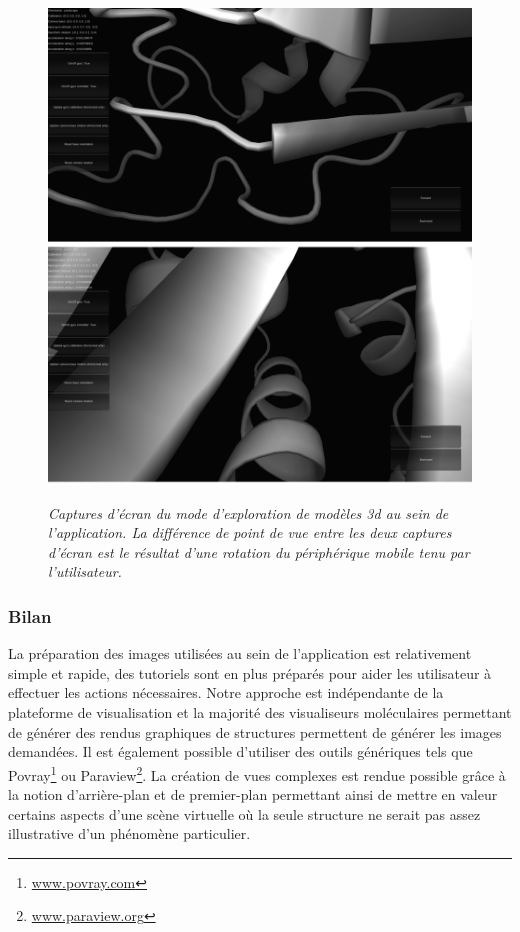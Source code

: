 \begin{figure}[h]
  \centering
  {\includegraphics[width=.75\linewidth]{./figures/ch3/molexplorer_screenshot.png}}
    \caption{{\it Captures d'écran du mode d'exploration de modèles 3d au sein de l'application. La différence de point de vue entre les deux captures d'écran est le résultat d'une rotation du périphérique mobile tenu par l'utilisateur.}}
  \label{Fig:molexplorer_screenshot}
  \hspace{0.2cm}
\end{figure}

\subsubsection{Bilan}

La préparation des images utilisées au sein de l'application est relativement simple et rapide, des tutoriels sont en plus préparés pour aider les utilisateur à effectuer les actions nécessaires. Notre approche est indépendante de la plateforme de visualisation et la majorité des visualiseurs moléculaires permettant de générer des rendus graphiques de structures permettent de générer les images demandées. Il est également possible d'utiliser des outils génériques tels que Povray\footnote{\url{www.povray.com}} ou Paraview\footnote{\url{www.paraview.org}}. La création de vues complexes est rendue possible grâce à la notion d'arrière-plan et de premier-plan permettant ainsi de mettre en valeur certains aspects d'une scène virtuelle où la seule structure ne serait pas assez illustrative d'un phénomène particulier.

